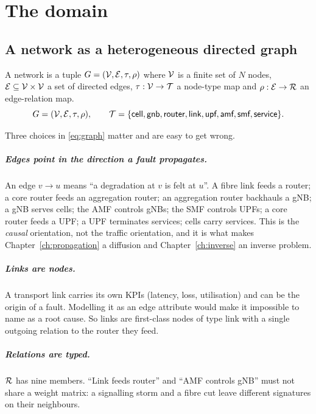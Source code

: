 \chapter{The domain}
\label{ch:domain}

\section{A network as a heterogeneous directed graph}
\begin{definition}
A network is a tuple $G=(\mathcal{V},\mathcal{E},\tau,\rho)$ where $\mathcal{V}$ is a finite set of $N$ nodes,
$\mathcal{E}\subseteq\mathcal{V}\times\mathcal{V}$ a set of directed edges, $\tau:\mathcal{V}\to\mathcal{T}$ a node-type map and
$\rho:\mathcal{E}\to\mathcal{R}$ an edge-relation map.
\begin{equation}
G=(\mathcal{V},\mathcal{E},\tau,\rho),\qquad
\mathcal{T}=\{\textsf{cell},\textsf{gnb},\textsf{router},\textsf{link},\textsf{upf},\textsf{amf},\textsf{smf},\textsf{service}\}.
\label{eq:graph}
\end{equation}
\end{definition}

Three choices in \eqref{eq:graph} matter and are easy to get wrong.

\paragraph{Edges point in the direction a fault propagates.} An edge $v\to u$ means ``a
degradation at $v$ is felt at $u$''. A fibre link feeds a router; a core router feeds an aggregation
router; an aggregation router backhauls a gNB; a gNB serves cells; the AMF controls gNBs; the SMF
controls UPFs; a core router feeds a UPF; a UPF terminates services; cells carry services. This
is the \emph{causal} orientation, not the traffic orientation, and it is what makes
Chapter~\ref{ch:propagation} a diffusion and Chapter~\ref{ch:inverse} an inverse problem.

\paragraph{Links are nodes.} A transport link carries its own KPIs (latency, loss, utilisation)
and can be the origin of a fault. Modelling it as an edge attribute would make it impossible to
name as a root cause. So links are first-class nodes of type \textsf{link} with a single outgoing
relation to the router they feed.

\paragraph{Relations are typed.} $\mathcal{R}$ has nine members. ``Link feeds router'' and ``AMF controls
gNB'' must not share a weight matrix: a signalling storm and a fibre cut leave different
signatures on their neighbours.

